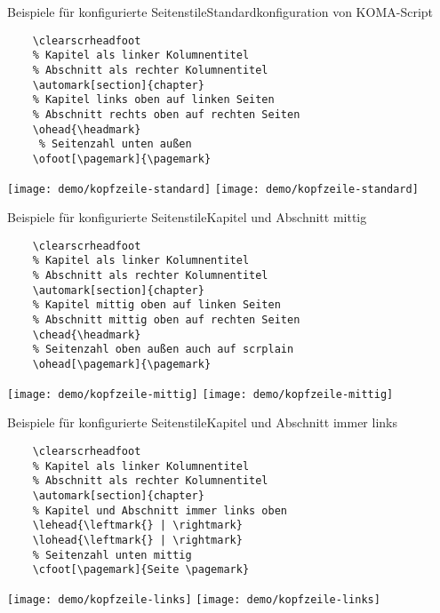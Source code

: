 \begin{frame}[t,fragile]{Beispiele für konfigurierte Seitenstile}{Standardkonfiguration von KOMA-Script}
  \begin{lstlisting}[gobble=4]
    % Alles löschen
    \clearscrheadfoot
    % Kapitel als linker Kolumnentitel
    % Abschnitt als rechter Kolumnentitel
    \automark[section]{chapter}
    % Kapitel links oben auf linken Seiten
    % Abschnitt rechts oben auf rechten Seiten
    \ohead{\headmark}
     % Seitenzahl unten außen
    \ofoot[\pagemark]{\pagemark}
  \end{lstlisting}

  \texttt{[image: demo/kopfzeile-standard]}%
  \texttt{[image: demo/kopfzeile-standard]}%
\end{frame}

\begin{frame}[t,fragile]{Beispiele für konfigurierte Seitenstile}{Kapitel und Abschnitt mittig}
  \begin{lstlisting}[gobble=4]
    % Alles löschen
    \clearscrheadfoot
    % Kapitel als linker Kolumnentitel
    % Abschnitt als rechter Kolumnentitel
    \automark[section]{chapter}
    % Kapitel mittig oben auf linken Seiten
    % Abschnitt mittig oben auf rechten Seiten
    \chead{\headmark}
    % Seitenzahl oben außen auch auf scrplain
    \ohead[\pagemark]{\pagemark}
  \end{lstlisting}

  \texttt{[image: demo/kopfzeile-mittig]}%
  \texttt{[image: demo/kopfzeile-mittig]}%
\end{frame}

\begin{frame}[t,fragile]{Beispiele für konfigurierte Seitenstile}{Kapitel und Abschnitt immer links}
  \begin{lstlisting}[gobble=4]
    % Alles löschen
    \clearscrheadfoot
    % Kapitel als linker Kolumnentitel
    % Abschnitt als rechter Kolumnentitel
    \automark[section]{chapter}
    % Kapitel und Abschnitt immer links oben
    \lehead{\leftmark{} | \rightmark}
    \lohead{\leftmark{} | \rightmark}
    % Seitenzahl unten mittig
    \cfoot[\pagemark]{Seite \pagemark}
  \end{lstlisting}

  \texttt{[image: demo/kopfzeile-links]}%
  \texttt{[image: demo/kopfzeile-links]}%
\end{frame}

